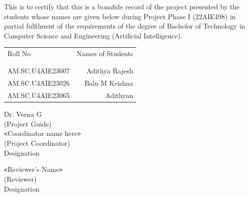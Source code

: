 \documentclass[a4paper, 12pt]{report}
\theoremstyle{definition}
\begin{document}
	\vspace*{.8cm}
	This is to certify that this is a bonafide record of the project presented by the students whose names are given below during Project Phase I (22AIE498) in partial fulfilment of the requirements of the degree of Bachelor of Technology in Computer Science and Engineering (Artificial Intelligence).\\[1.0cm]

\begin{table}[h]
\centering
\begin{tabular}{lr}
Roll No & Names of Students \\ \\ \hline
\\
AM.SC.U4AIE23007 & Adithya Rajesh \\ 
AM.SC.U4AIE23026 & Balu M Krishna \\
AM.SC.U4AIE23065 & Adithyan \\

\end{tabular}
\end{table}



\begin{flushleft}
  Dr. Veena G\\
(Project Guide)\\  [1cm]

 \texttt{<}Coordinator name here\texttt{>}\\
(Project Coordinator)\\
Designation\\
\end{flushleft}
\begin{flushright}
\texttt{<}Reviewer's Name\texttt{>}\\
(Reviewer)\\
Designation
\end{flushright}




\newpage
	\clearpage
	\tableofcontents
	
\end{document}

